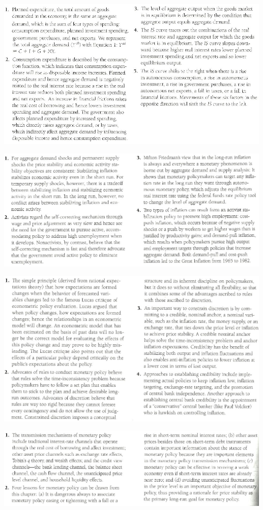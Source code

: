 \documentclass[12pt]{examnotes}
\begin{document}
\includegraphics[scale=0.45]{./imgs/sum21.jpg}

\includegraphics[scale=0.5]{./imgs/sum24.jpg}

\includegraphics[scale=0.5]{./imgs/sum25.jpg}

\includegraphics[scale=0.5]{./imgs/sum26.jpg}
\end{document}
